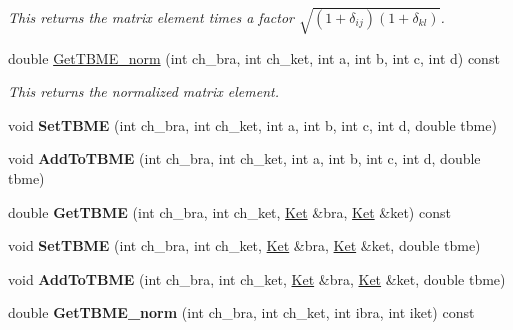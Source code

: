 \begin{DoxyCompactItemize}
\begin{DoxyCompactList}\small\item\em This returns the matrix element times a factor $ \sqrt{(1+\delta_{ij})(1+\delta_{kl})} $. \end{DoxyCompactList}\item 
\mbox{\label{classTwoBodyME_a26ca6f74a4815c5b23c82fe2c29f8f36}} 
double \hyperlink{classTwoBodyME_a26ca6f74a4815c5b23c82fe2c29f8f36}{Get\+T\+B\+M\+E\+\_\+norm} (int ch\+\_\+bra, int ch\+\_\+ket, int a, int b, int c, int d) const
\begin{DoxyCompactList}\small\item\em This returns the normalized matrix element. \end{DoxyCompactList}\item 
\mbox{\label{classTwoBodyME_a361aa001f5e09b6a906bbd0504582e2b}} 
void {\bfseries Set\+T\+B\+ME} (int ch\+\_\+bra, int ch\+\_\+ket, int a, int b, int c, int d, double tbme)
\item 
\mbox{\label{classTwoBodyME_af5c7ce4cf4638b7946db6aa01b502455}} 
void {\bfseries Add\+To\+T\+B\+ME} (int ch\+\_\+bra, int ch\+\_\+ket, int a, int b, int c, int d, double tbme)
\item 
\mbox{\label{classTwoBodyME_a5e6112c43feadffc5b5eb0c01aaa0f7c}} 
double {\bfseries Get\+T\+B\+ME} (int ch\+\_\+bra, int ch\+\_\+ket, \hyperlink{classKet}{Ket} \&bra, \hyperlink{classKet}{Ket} \&ket) const
\item 
\mbox{\label{classTwoBodyME_a3c217bf0da82dd9a4bfbe364852af672}} 
void {\bfseries Set\+T\+B\+ME} (int ch\+\_\+bra, int ch\+\_\+ket, \hyperlink{classKet}{Ket} \&bra, \hyperlink{classKet}{Ket} \&ket, double tbme)
\item 
\mbox{\label{classTwoBodyME_a314e2a6279e88c00c8ae5a2f12a73a59}} 
void {\bfseries Add\+To\+T\+B\+ME} (int ch\+\_\+bra, int ch\+\_\+ket, \hyperlink{classKet}{Ket} \&bra, \hyperlink{classKet}{Ket} \&ket, double tbme)
\item 
\mbox{\label{classTwoBodyME_a1fd7f49611b96d44705684b63480e5ff}} 
double {\bfseries Get\+T\+B\+M\+E\+\_\+norm} (int ch\+\_\+bra, int ch\+\_\+ket, int ibra, int iket) const

\end{DoxyCompactItemize}
